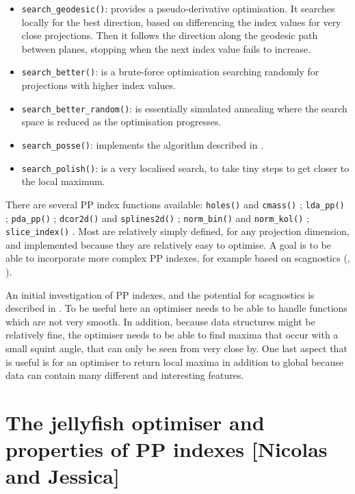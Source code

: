 \documentclass[
  number,
  preprint,
  3p]{elsarticle}
\providecommand{\tightlist}{%
  \setlength{\itemsep}{0pt}\setlength{\parskip}{0pt}}\usepackage{longtable,booktabs,array}
\begin{document}
\begin{itemize}
\tightlist
\item
  \texttt{search\_geodesic()}: provides a pseudo-derivative
  optimisation. It searches locally for the best direction, based on
  differencing the index values for very close projections. Then it
  follows the direction along the geodesic path between planes, stopping
  when the next index value fails to increase.
\item
  \texttt{search\_better()}: is a brute-force optimisation searching
  randomly for projections with higher index values.
\item
  \texttt{search\_better\_random()}: is essentially simulated annealing
  \citep{Bertsimas93} where the search space is reduced as the
  optimisation progresses.
\item
  \texttt{search\_posse()}: implements the algorithm described in
  \citet{posse95}.
\item
  \texttt{search\_polish()}: is a very localised search, to take tiny
  steps to get closer to the local maximum.
\end{itemize}

There are several PP index functions available: \texttt{holes()} and
\texttt{cmass()} \citep{cook1993projection}; \texttt{lda\_pp()}
\citep{lee2005projection}; \texttt{pda\_pp()} \citep{lee2010projection};
\texttt{dcor2d()} and \texttt{splines2d()} \citep{Grimm2016};
\texttt{norm\_bin()} and \texttt{norm\_kol()} \citep{huber85};
\texttt{slice\_index()} \citep{Laa:2020wkm}. Most are relatively simply
defined, for any projection dimension, and implemented because they are
relatively easy to optimise. A goal is to be able to incorporate more
complex PP indexes, for example based on scagnostics (\citet{scag},
\citet{WW08}).

An initial investigation of PP indexes, and the potential for
scagnostics is described in \citet{laa_using_2020}. To be useful here an
optimiser needs to be able to handle functions which are not very
smooth. In addition, because data structures might be relatively fine,
the optimiser needs to be able to find maxima that occur with a small
squint angle, that can only be seen from very close by. One last aspect
that is useful is for an optimiser to return local maxima in addition to
global because data can contain many different and interesting features.

\section{The jellyfish optimiser and properties of PP indexes {[}Nicolas
and Jessica{]}}\label{sec-theory}
\end{document}
